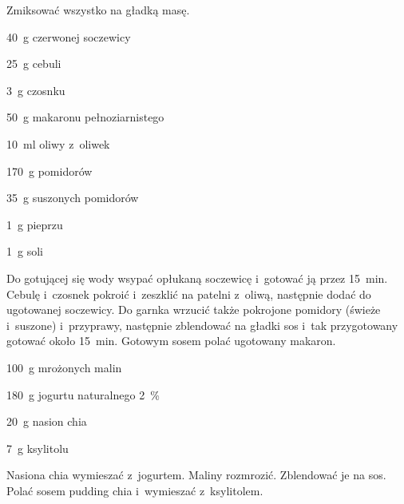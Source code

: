 \documentclass[../kucharek.tex]{subfiles}
\begin{document}
Zmiksować wszystko na gładką masę.


\begin{Ingred}
    \item \qty{40}{\gram} czerwonej soczewicy
    \item \qty{25}{\gram} cebuli
    \item \qty{3}{\gram} czosnku
    \item \qty{50}{\gram} makaronu pełnoziarnistego
    \item \qty{10}{\milli\litre} oliwy z~oliwek
    \item \qty{170}{\gram} pomidorów
    \item \qty{35}{\gram} suszonych pomidorów
    \item \qty{1}{\gram} pieprzu
    \item \qty{1}{\gram} soli
\end{Ingred}

Do gotującej się wody wsypać opłukaną soczewicę i~gotować ją przez
\qty{15}{\minute}. Cebulę i~czosnek pokroić i~zeszklić na patelni z~oliwą,
następnie dodać do ugotowanej soczewicy. Do garnka wrzucić także pokrojone
pomidory (świeże i~suszone) i~przyprawy, następnie zblendować na gładki sos
i~tak przygotowany gotować około \qty{15}{\minute}. Gotowym sosem polać
ugotowany makaron.


\begin{Ingred}
    \item \qty{100}{\gram} mrożonych malin
    \item \qty{180}{\gram} jogurtu naturalnego \qty{2}{\percent}
    \item \qty{20}{\gram} nasion chia
    \item \qty{7}{\gram} ksylitolu
\end{Ingred}

Nasiona chia wymieszać z~jogurtem. Maliny rozmrozić. Zblendować je na sos.
Polać sosem pudding chia i~wymieszać z~ksylitolem.

\end{document}

